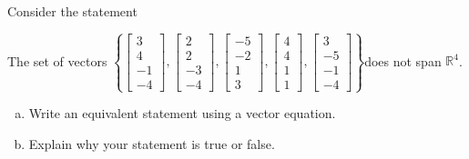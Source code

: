 
\begin{exerciseStatement}


Consider the statement 
\begin{center}\begin{minipage}{0.8\textwidth}
 The set of vectors \( \left\{ \left[\begin{array}{c}
3 \\
4 \\
-1 \\
-4
\end{array}\right] , \left[\begin{array}{c}
2 \\
2 \\
-3 \\
-4
\end{array}\right] , \left[\begin{array}{c}
-5 \\
-2 \\
1 \\
3
\end{array}\right] , \left[\begin{array}{c}
4 \\
4 \\
1 \\
1
\end{array}\right] , \left[\begin{array}{c}
3 \\
-5 \\
-1 \\
-4
\end{array}\right] \right\} \)does not span \(\mathbb{R}^4\). 
\end{minipage}\end{center}
    


\begin{enumerate}[(a)]
\item  Write an equivalent statement using a vector equation.
\item  Explain why your statement is true or false.
\end{enumerate}
    
\end{exerciseStatement}
    
